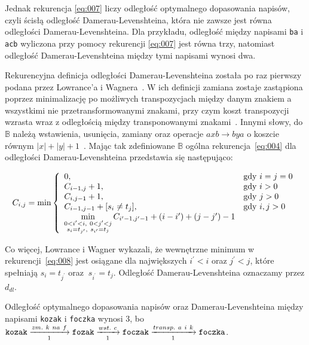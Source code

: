 \documentclass{praca1}
\begin{document}
Jednak rekurencja \ref{eq:007} liczy odległość optymalnego dopasowania napisów, czyli ścisłą odległość Damerau-Levenshteina, która nie zawsze jest równa odległości Damerau-Levenshteina. Dla przykładu, odległość między napisami \verb|ba| i \verb|acb| wyliczona przy pomocy rekurencji \ref{eq:007} jest równa trzy, natomiast odległość Damerau-Levenshteina między tymi napisami wynosi dwa.

Rekurencyjna definicja odległości Damerau-Levenshteina została po raz pierwszy podana przez Lowrance'a i Wagnera~\cite{Wagner1975:extensionstring}. W ich definicji zamiana zostaje zastąpiona poprzez minimalizację po możliwych transpozycjach między danym znakiem a wszystkimi nie przetransformowanymi znakami, przy czym koszt transpozycji wzrasta wraz z odległością między transponowanymi znakami~\cite{Loo2014:stringdist}. Innymi słowy, do $\mathbb{B}$ należą wstawienia, usunięcia, zamiany oraz operacje $axb \rightarrow bya$ o koszcie równym $|x| + |y| + 1$~\cite{Boytsov2011:indexingmethods}. Mając tak zdefiniowane $\mathbb{B}$ ogólna rekurencja~\ref{eq:004} dla odległości Damerau-Levenshteina przedstawia się następująco: 

\begin{equation}
\label{eq:008}
C_{i,j} = \min\left\{
\begin{array}{l l}     
    0, & \text{gdy } i = j = 0\\
    C_{i-1, j} + 1, & \text{gdy } i > 0 \\
    C_{i, j-1} + 1, & \text{gdy } j > 0 \\
    C_{i-1, j-1} + [s_{i}\neq t_{j}], & \text{gdy } i, j > 0 \\
    \min\limits_{\substack{0 < i^{\prime} < i,\ 0 < j^{\prime} < j  \\ s_i = t_{j^{\prime}},\ s_{i^{\prime}} = t_j}} C_{i^{\prime}-1, j^{\prime}-1} + (i-i^{\prime}) + (j-j^{\prime}) - 1
\end{array}\right.
\end{equation}

Co więcej, Lowrance i Wagner wykazali, że wewnętrzne minimum w rekurencji~\ref{eq:008} jest osiągane dla największych $i^{\prime} < i$ oraz $j^{\prime} < j$, które spełniają $s_i = t_{j^{\prime}}$ oraz $\ s_{i^{\prime}} = t_j$. Odległość Damerau-Levenshteina oznaczamy przez $d_{dl}$.

\begin{example}
Odległość optymalnego dopasowania napisów oraz Damerau-Levenshteina między napisami \verb|kozak| i \verb|foczka| wynosi $3$, bo $\verb|kozak| \xrightarrow[1]{zm.\ k\ na\ f} \verb|fozak|  \xrightarrow[1]{wst.\ c} \verb|foczak| \xrightarrow[1]{transp.\ a\ i\ k} \verb|foczka|$.
\end{example}
\end{document}
